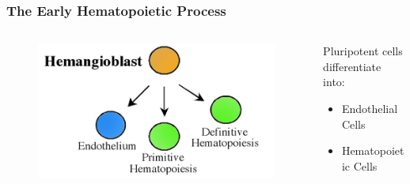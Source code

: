 \documentclass{beamer}
\begin{document}
\begin{frame}
	\frametitle{The Early Hematopoietic  Process}
	\begin{columns}[T] %
		\begin{column}{.48\textwidth}
			\begin{figure}
				\includegraphics*[width=  \linewidth]{./images/hematopoieisis.jpg}
			\end{figure}
		\end{column}%
		\hfill%
		\begin{column}{.48\textwidth}
			Pluripotent cells differentiate into:
			\begin{itemize}
				\item Endothelial Cells
				\item Hematopoietic Cells
			\end{itemize}
		\end{column}%
	\end{columns}
\end{frame}
\end{document}
